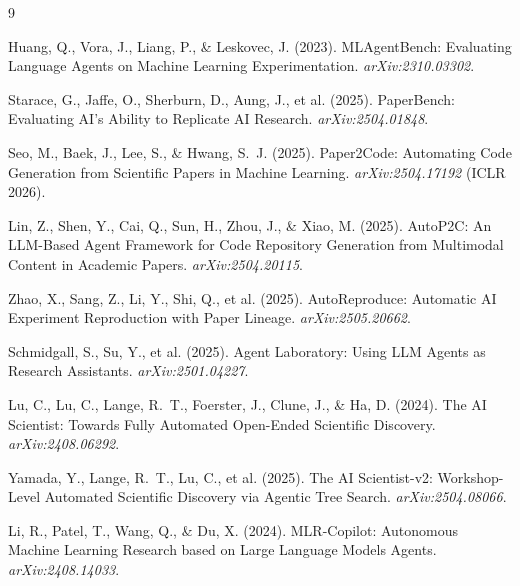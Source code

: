 \documentclass[10pt,twocolumn]{article}
\begin{document}

\begin{thebibliography}{9}

Huang, Q., Vora, J., Liang, P., \& Leskovec, J. (2023).
MLAgentBench: Evaluating Language Agents on Machine Learning Experimentation.
\textit{arXiv:2310.03302}.

Starace, G., Jaffe, O., Sherburn, D., Aung, J., et al. (2025).
PaperBench: Evaluating AI's Ability to Replicate AI Research.
\textit{arXiv:2504.01848}.

Seo, M., Baek, J., Lee, S., \& Hwang, S.~J. (2025).
Paper2Code: Automating Code Generation from Scientific Papers in Machine Learning.
\textit{arXiv:2504.17192} (ICLR 2026).

Lin, Z., Shen, Y., Cai, Q., Sun, H., Zhou, J., \& Xiao, M. (2025).
AutoP2C: An LLM-Based Agent Framework for Code Repository Generation from Multimodal
Content in Academic Papers.
\textit{arXiv:2504.20115}.

Zhao, X., Sang, Z., Li, Y., Shi, Q., et al. (2025).
AutoReproduce: Automatic AI Experiment Reproduction with Paper Lineage.
\textit{arXiv:2505.20662}.

Schmidgall, S., Su, Y., et al. (2025).
Agent Laboratory: Using LLM Agents as Research Assistants.
\textit{arXiv:2501.04227}.

Lu, C., Lu, C., Lange, R.~T., Foerster, J., Clune, J., \& Ha, D. (2024).
The AI Scientist: Towards Fully Automated Open-Ended Scientific Discovery.
\textit{arXiv:2408.06292}.

Yamada, Y., Lange, R.~T., Lu, C., et al. (2025).
The AI Scientist-v2: Workshop-Level Automated Scientific Discovery via Agentic Tree
Search.
\textit{arXiv:2504.08066}.

Li, R., Patel, T., Wang, Q., \& Du, X. (2024).
MLR-Copilot: Autonomous Machine Learning Research based on Large Language Models Agents.
\textit{arXiv:2408.14033}.

\end{thebibliography}
\end{document}
